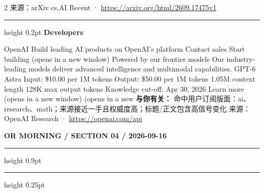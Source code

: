 \documentclass[10.5pt]{ctexart}
\begin{document}
\begin{multicols}{2}
{\footnotesize\color{ormuted} 来源：arXiv cs.AI Recent · \url{https://arxiv.org/html/2609.17475v1}}
\vspace{2mm}
\hrule height 0.2pt
\vspace{2mm}
{\large\bfseries Developers}\par
OpenAI Build leading AI products on OpenAI’s platform Contact sales Start building (opens in a new window) Powered by our frontier models Our industry-leading models deliver advanced intelligence and multimodal capabilities. GPT-6 Astra Input: \$10.00 per 1M tokens Output: \$50.00 per 1M tokens 1.05M context length 128K max output tokens Knowledge cut-off: Apr 30, 2026 Learn more (opens in a new window) (opens in a new
\textbf{与你有关：} 命中用户订阅版面：ai、research、math；来源接近一手且权威度高；标题/正文包含高信号变化
{\footnotesize\color{ormuted} 来源：OpenAI Research · \url{https://openai.com/api}}
\end{multicols}
\newpage
{\small\bfseries OR MORNING / SECTION 04 / 2026-09-16}
\vspace{2mm}
\hrule height 0.9pt
\vspace{1.5mm}
\hrule height 0.25pt
\vspace{4mm}
\end{document}
